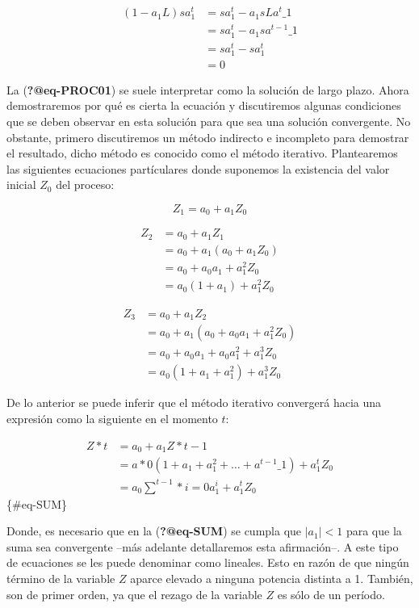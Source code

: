 \documentclass[
  a4paper,
]{article}
\begin{document}
\begin{align}
(1 - a_1 L) s a^t_1 & = s a^t_1 - a_1 s L a^{t}\_1 \nonumber \\
& = s a^t_1 - a_1 s a^{t - 1}\_1 \nonumber \\
& = s a^t_1 - s a^t_1 \nonumber \\
& = 0 \nonumber
\end{align}

La (\textbf{?@eq-PROC01}) se suele interpretar como la solución de largo
plazo. Ahora demostraremos por qué es cierta la ecuación y discutiremos
algunas condiciones que se deben observar en esta solución para que sea
una solución convergente. No obstante, primero discutiremos un método
indirecto e incompleto para demostrar el resultado, dicho método es
conocido como el método iterativo. Plantearemos las siguientes
ecuaciones partículares donde suponemos la existencia del valor inicial
\(Z_0\) del proceso:

\begin{equation*}
Z_1 = a_0 + a_1 Z_0
\end{equation*}

\begin{align*}
Z_2 & = a_0 + a_1 Z_1 \\
& = a_0 + a_1 (a_0 + a_1 Z_0) \\
& = a_0 + a_0 a_1 + a^2_1 Z_0 \\
& = a_0 (1 + a_1) + a^2_1 Z_0
\end{align*}

\begin{align*}
Z_3 & = a_0 + a_1 Z_2 \\
& = a_0 + a_1 (a_0 + a_0 a_1 + a^2_1 Z_0) \\
& = a_0 + a_0 a_1 + a_0 a^2_1 + a^3_1 Z_0 \\
& = a_0 (1 + a_1 + a^2_1) + a^3_1 Z_0
\end{align*}

De lo anterior se puede inferir que el método iterativo convergerá hacia
una expresión como la siguiente en el momento \(t\):

\begin{align}
Z*t & = a_0 + a_1 Z*{t-1} \nonumber \\
& = a*0 (1 + a_1 + a^2_1 + \ldots + a^{t-1}\_1) + a^t_1 Z_0 \nonumber \\
& = a_0 \sum^{t-1}*{i = 0}{a^i_1} + a^t_1 Z_0
\end{align} \{\#eq-SUM\}

Donde, es necesario que en la (\textbf{?@eq-SUM}) se cumpla que
\(\lvert{a_1}\lvert < 1\) para que la suma sea convergente --más
adelante detallaremos esta afirmación--. A este tipo de ecuaciones se
les puede denominar como lineales. Esto en razón de que ningún término
de la variable \(Z\) aparce elevado a ninguna potencia distinta a 1.
También, son de primer orden, ya que el rezago de la variable \(Z\) es
sólo de un período.
\end{document}
